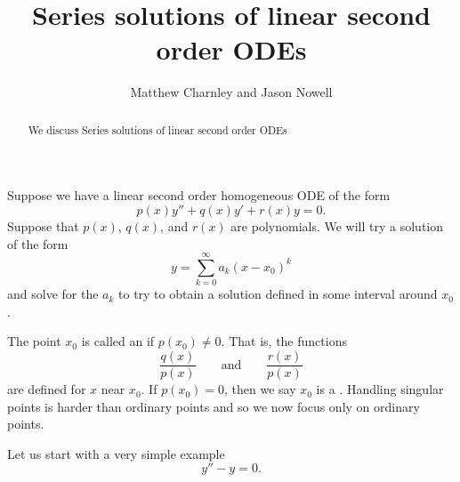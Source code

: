 \documentclass{ximera}
\title{Series solutions of linear second order ODEs}
\author{Matthew Charnley and Jason Nowell}
\begin{document}
\begin{abstract}
    We discuss Series solutions of linear second order ODEs
\end{abstract}
\maketitle

\label{seriessols:section}




Suppose we have a linear second order homogeneous ODE of the form
\begin{equation*}
    p(x) y'' + q(x) y' + r(x) y = 0 .
\end{equation*}
Suppose that $p(x)$, $q(x)$, and $r(x)$ are polynomials.  We will  try a solution of the form
\begin{equation*}
    y = \sum_{k=0}^\infty a_k {(x-x_0)}^k
\end{equation*}
and solve for the $a_k$ to try to obtain a solution defined in some interval around $x_0$.

The point $x_0$ is called an \emph{} if $p(x_0) \not= 0$.  That is, the functions
\begin{equation*}
    \frac{q(x)}{p(x)} \qquad \text{and} \qquad \frac{r(x)}{p(x)}
\end{equation*}
are defined for $x$ near $x_0$.  If $p(x_0) = 0$, then we say $x_0$ is a \emph{}.  Handling singular points is harder than ordinary points and so we now focus only on ordinary points.

\begin{example}
    Let us start with a very simple example
    \begin{equation*}
        y'' - y = 0 .
    \end{equation*}
\end{example}
\end{document}
